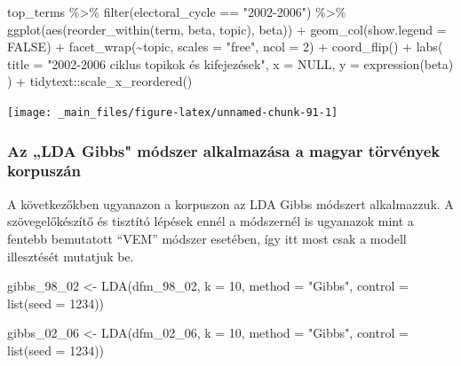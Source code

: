 \documentclass[
]{book}
\newenvironment{Shaded}{\begin{snugshade}}{\end{snugshade}}
\newcommand{\AttributeTok}[1]{\textcolor[rgb]{0.77,0.63,0.00}{#1}}
\newcommand{\ConstantTok}[1]{\textcolor[rgb]{0.00,0.00,0.00}{#1}}
\newcommand{\DecValTok}[1]{\textcolor[rgb]{0.00,0.00,0.81}{#1}}
\newcommand{\FunctionTok}[1]{\textcolor[rgb]{0.00,0.00,0.00}{#1}}
\newcommand{\NormalTok}[1]{#1}
\newcommand{\OtherTok}[1]{\textcolor[rgb]{0.56,0.35,0.01}{#1}}
\newcommand{\SpecialCharTok}[1]{\textcolor[rgb]{0.00,0.00,0.00}{#1}}
\newcommand{\StringTok}[1]{\textcolor[rgb]{0.31,0.60,0.02}{#1}}
\begin{document}
\begin{Shaded}
\begin{Highlighting}[]
\NormalTok{top\_terms }\SpecialCharTok{\%\textgreater{}\%}
  \FunctionTok{filter}\NormalTok{(electoral\_cycle }\SpecialCharTok{==} \StringTok{"2002{-}2006"}\NormalTok{) }\SpecialCharTok{\%\textgreater{}\%}
  \FunctionTok{ggplot}\NormalTok{(}\FunctionTok{aes}\NormalTok{(}\FunctionTok{reorder\_within}\NormalTok{(term, beta, topic), beta)) }\SpecialCharTok{+}
  \FunctionTok{geom\_col}\NormalTok{(}\AttributeTok{show.legend =} \ConstantTok{FALSE}\NormalTok{) }\SpecialCharTok{+}
  \FunctionTok{facet\_wrap}\NormalTok{(}\SpecialCharTok{\textasciitilde{}}\NormalTok{topic, }\AttributeTok{scales =} \StringTok{"free"}\NormalTok{, }\AttributeTok{ncol =} \DecValTok{2}\NormalTok{) }\SpecialCharTok{+}
  \FunctionTok{coord\_flip}\NormalTok{() }\SpecialCharTok{+}
  \FunctionTok{labs}\NormalTok{(}
    \AttributeTok{title =} \StringTok{"2002{-}2006 ciklus topikok és kifejezések"}\NormalTok{,}
    \AttributeTok{x =} \ConstantTok{NULL}\NormalTok{,}
    \AttributeTok{y =} \FunctionTok{expression}\NormalTok{(beta)}
\NormalTok{  ) }\SpecialCharTok{+}
\NormalTok{  tidytext}\SpecialCharTok{::}\FunctionTok{scale\_x\_reordered}\NormalTok{()}
\end{Highlighting}
\end{Shaded}

\begin{center}\texttt{[image: \_main\_files/figure-latex/unnamed-chunk-91-1]} \end{center}

\hypertarget{az-lda-gibbs-muxf3dszer-alkalmazuxe1sa-a-magyar-tuxf6rvuxe9nyek-korpuszuxe1n}{%
\subsubsection{Az „LDA Gibbs" módszer alkalmazása a magyar törvények
korpuszán}\label{az-lda-gibbs-muxf3dszer-alkalmazuxe1sa-a-magyar-tuxf6rvuxe9nyek-korpuszuxe1n}}

A következőkben ugyanazon a korpuszon az LDA Gibbs módszert alkalmazzuk.
A szövegelőkészítő és tisztító lépések ennél a módszernél is ugyanazok
mint a fentebb bemutatott ``VEM'' módszer esetében, így itt most csak a
modell illesztését mutatjuk be.

\begin{Shaded}
\begin{Highlighting}[]

\NormalTok{gibbs\_98\_02 }\OtherTok{\textless{}{-}} \FunctionTok{LDA}\NormalTok{(dfm\_98\_02, }\AttributeTok{k =} \DecValTok{10}\NormalTok{, }\AttributeTok{method =} \StringTok{"Gibbs"}\NormalTok{, }\AttributeTok{control =} \FunctionTok{list}\NormalTok{(}\AttributeTok{seed =} \DecValTok{1234}\NormalTok{))}

\NormalTok{gibbs\_02\_06 }\OtherTok{\textless{}{-}} \FunctionTok{LDA}\NormalTok{(dfm\_02\_06, }\AttributeTok{k =} \DecValTok{10}\NormalTok{, }\AttributeTok{method =} \StringTok{"Gibbs"}\NormalTok{, }\AttributeTok{control =} \FunctionTok{list}\NormalTok{(}\AttributeTok{seed =} \DecValTok{1234}\NormalTok{))}
\end{Highlighting}
\end{Shaded}
\end{document}
